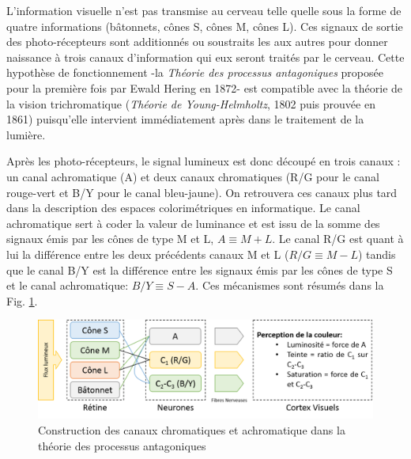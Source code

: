 	\par L'information visuelle n'est pas transmise au cerveau telle quelle sous la forme de quatre informations (bâtonnets, cônes S, cônes M, cônes L). Ces signaux de sortie des photo-récepteurs sont additionnés ou soustraits les aux autres pour donner naissance à trois canaux d'information qui eux seront traités par le cerveau. Cette hypothèse de fonctionnement  -la \textit{Théorie des processus antagoniques} proposée pour la première fois par Ewald Hering en 1872- est compatible avec la théorie de la vision trichromatique (\textit{Théorie de Young-Helmholtz}, 1802 puis prouvée en 1861) puisqu'elle intervient immédiatement après dans le traitement de la lumière.
	
	\par Après les photo-récepteurs, le signal lumineux est donc découpé en trois canaux \citep{glassner_principles_1995,winkler_issues_1999}: un canal achromatique (A) et deux canaux chromatiques (R/G pour le canal rouge-vert et B/Y pour le canal bleu-jaune). On retrouvera ces canaux plus tard dans la description des espaces colorimétriques en informatique. Le canal achromatique sert à coder la valeur de luminance et est issu de la somme des signaux émis par les cônes de type M et L, $A \equiv M + L$. Le canal R/G est quant à lui la différence entre les deux précédents canaux M et L ($R/G \equiv M - L$) tandis que le canal B/Y est la différence entre les signaux émis par les cônes de type S et le canal achromatique: $B/Y \equiv S - A$. Ces mécanismes sont résumés dans la Fig. \ref{fig:opponent_colors_theory}.
	
	\begin{figure}[h]
		\centering
		\includegraphics[scale=.6]{Figures/OpponentColorsTheory}
		\caption{Construction des canaux chromatiques et achromatique dans la théorie des processus antagoniques}
		\label{fig:opponent_colors_theory}
	\end{figure}
	
